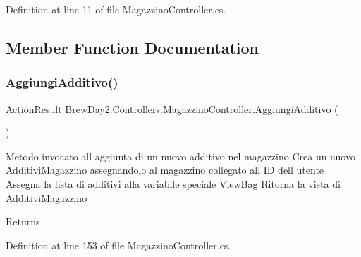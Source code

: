 Definition at line 11 of file Magazzino\+Controller.\+cs.



\subsection{Member Function Documentation}
\mbox{\label{class_brew_day2_1_1_controllers_1_1_magazzino_controller_a41e900928edeabedf141af5ecb5d4a8a}} 
\subsubsection{\texorpdfstring{Aggiungi\+Additivo()}{AggiungiAdditivo()}\hspace{0.1cm}{\footnotesize\ttfamily [1/2]}}
{\footnotesize\ttfamily Action\+Result Brew\+Day2.\+Controllers.\+Magazzino\+Controller.\+Aggiungi\+Additivo (\begin{DoxyParamCaption}{ }\end{DoxyParamCaption})}



Metodo invocato all\textquotesingle{} aggiunta di un nuovo additivo nel magazzino Crea un nuovo Additivi\+Magazzino assegnandolo al magazzino collegato all\textquotesingle{} ID dell\textquotesingle{} utente Assegna la lista di additivi alla variabile speciale View\+Bag Ritorna la vista di Additivi\+Magazzino 

\begin{DoxyReturn}{Returns}

\end{DoxyReturn}


Definition at line 153 of file Magazzino\+Controller.\+cs.

\mbox{\label{class_brew_day2_1_1_controllers_1_1_magazzino_controller_a01eb9baa8099142e115592797ecc2e1f}} 
